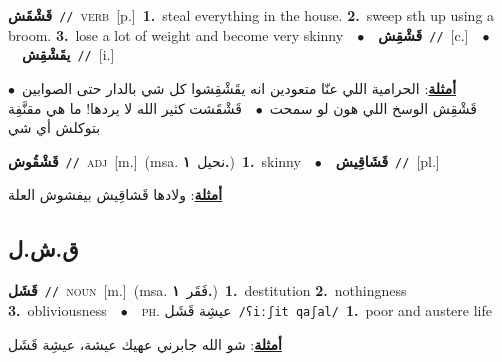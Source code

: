 \documentclass[10pt,a4paper,twoside]{article} %
\begin{document}
\begin{multicols}{2}
{\setlength\topsep{0pt}\textbf{\foreignlanguage{arabic}{قَشْقَش}}\ {\color{gray}\texttt{//}\color{black}}\ \textsc{verb}\ [p.]\ \textbf{1.}~steal everything in the house.  \textbf{2.}~sweep sth up using a broom.  \textbf{3.}~lose a lot of weight and become very skinny\ \ $\bullet$\ \ \setlength\topsep{0pt}\textbf{\foreignlanguage{arabic}{قَشْقِش}}\ {\color{gray}\texttt{//}\color{black}}\ [c.]\ \ $\bullet$\ \ \setlength\topsep{0pt}\textbf{\foreignlanguage{arabic}{يقَشْقِش}}\ {\color{gray}\texttt{//}\color{black}}\ [i.]\  \begin{flushright}\color{gray}\foreignlanguage{arabic}{\textbf{\underline{\foreignlanguage{arabic}{أمثلة}}}: الحرامية اللي عنّا متعودين انه يقَشْقِشوا كل شي بالدار حتى الصوابين\ $\bullet$\ \  قَشْقِش الوسخ اللي هون لو سمحت\ $\bullet$\ \  قَشْقَشت كثير الله لا يردها! ما هي مقنَّفِة بتوكلش أي شي}\end{flushright}\color{black}} \vspace{2mm}

{\setlength\topsep{0pt}\textbf{\foreignlanguage{arabic}{قَشْقُوش}}\ {\color{gray}\texttt{//}\color{black}}\ \textsc{adj}\ [m.]\ \color{gray}(msa. \foreignlanguage{arabic}{نحيل}~\foreignlanguage{arabic}{\textbf{١.}})\color{black}\ \textbf{1.}~skinny\ \ $\bullet$\ \ \setlength\topsep{0pt}\textbf{\foreignlanguage{arabic}{قَشَاقِيش}}\ {\color{gray}\texttt{//}\color{black}}\ [pl.]\  \begin{flushright}\color{gray}\foreignlanguage{arabic}{\textbf{\underline{\foreignlanguage{arabic}{أمثلة}}}: ولادها قَشاقِيش بيفشوش العلة}\end{flushright}\color{black}} \vspace{2mm}

\vspace{-3mm}
\subsection*{\color{blue}\foreignlanguage{arabic}{ق.ش.ل}\color{blue}{}} 

{\setlength\topsep{0pt}\textbf{\foreignlanguage{arabic}{قَشَل}}\ {\color{gray}\texttt{//}\color{black}}\ \textsc{noun}\ [m.]\ \color{gray}(msa. \foreignlanguage{arabic}{فَقَر}~\foreignlanguage{arabic}{\textbf{١.}})\color{black}\ \textbf{1.}~destitution  \textbf{2.}~nothingness  \textbf{3.}~obliviousness\ \ $\bullet$\ \ \textsc{ph.} \color{gray} \foreignlanguage{arabic}{عيشِة قَشَل}\color{black}\ {\color{gray}\texttt{/{\sffamily ʕiːʃit qaʃal}/}\color{black}}\ \textbf{1.}~poor and austere life\  \begin{flushright}\color{gray}\foreignlanguage{arabic}{\textbf{\underline{\foreignlanguage{arabic}{أمثلة}}}: شو الله جابرني عهيك عيشة، عيشِة قَشَل}\end{flushright}\color{black}} \vspace{2mm}


\end{multicols}
\end{document}
